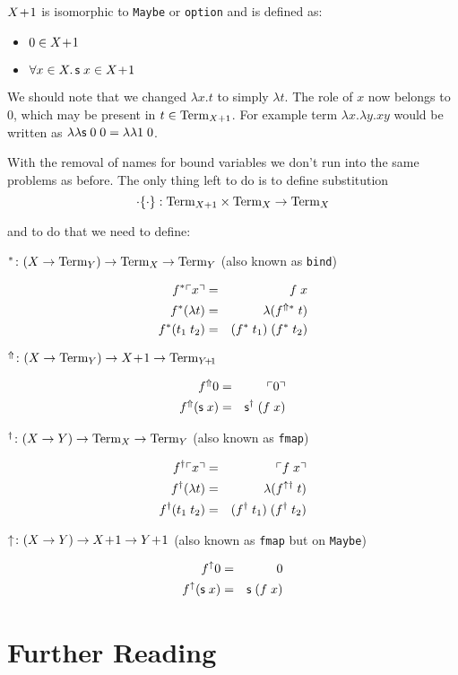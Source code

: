$X\!+\!1$ is isomorphic to \texttt{Maybe} or \texttt{option}
and is defined as:

\begin{itemize}
\item $0 \in X\!+\!1$
\item $\forall x \in X\ldotp \mathsf{s}\;x \in X\!+\!1$
\end{itemize}

We should note that we changed $\lambda x.t$ to simply $\lambda t$.
The role of $x$ now belongs to 0, which may be present in $t \in \mathrm{Term}_{X+1}$.
For example term $\lambda x.\lambda y. xy$
would be written as $\lambda\lambda \mathsf{s}\;0\;0 = \lambda\lambda 1\;0$.

With the removal of names for bound variables we don't run into the same problems as before.
The only thing left to do is to define substitution
\[
	\cdot\{\cdot\}:
  \mathrm{Term}_{X+1} \times \mathrm{Term}_{X} \to \mathrm{Term}_{X}
\]

and to do that we need to define:

$^* \colon (X \to \mathrm{Term}_{Y}) \to \mathrm{Term}_{X} \to \mathrm{Term}_{Y}$ (also known as \texttt{bind})

\begin{eqnarray*}
  f^*\ulcorner x \urcorner   & = & f\;x \\
  f^*(\lambda t) & = & \lambda (f^{\Uparrow*} \; t) \\
  f^*(t_1\;t_2)  & = & (f^* \; t_1) \; (f^* \; t_2)
\end{eqnarray*}

$^\Uparrow \colon (X \to \mathrm{Term}_{Y}) \to X\!+\!1 \to \mathrm{Term}_{Y\!+\!1}$

\begin{eqnarray*}
  f^\Uparrow 0 & = & \ulcorner 0 \urcorner \\
  f^\Uparrow (\mathsf{s} \; x) & = & \mathsf{s}^\dagger\;(f\;x) \\
\end{eqnarray*}

$^\dagger \colon (X \to Y) \to \mathrm{Term}_{X} \to \mathrm{Term}_{Y}$ (also known as \texttt{fmap})

\begin{eqnarray*}
  f^\dagger\ulcorner x \urcorner   & = & \ulcorner f\;x \urcorner \\
  f^\dagger(\lambda t) & = & \lambda(f^{\uparrow\dagger}\;t) \\
  f^\dagger(t_1\;t_2)  & = & (f^\dagger\;t_1)\;(f^\dagger\;t_2)
\end{eqnarray*}

$\uparrow \colon (X \to Y) \to X\!+\!1 \to Y\!+\!1$
  (also known as \texttt{fmap} but on \texttt{Maybe})

\begin{eqnarray*}
  f^\uparrow 0            & = & 0 \\
  f^\uparrow (\mathsf{s}\;x) & = & \mathsf{s}\;(f \; x)
\end{eqnarray*}

\section{Further Reading}
